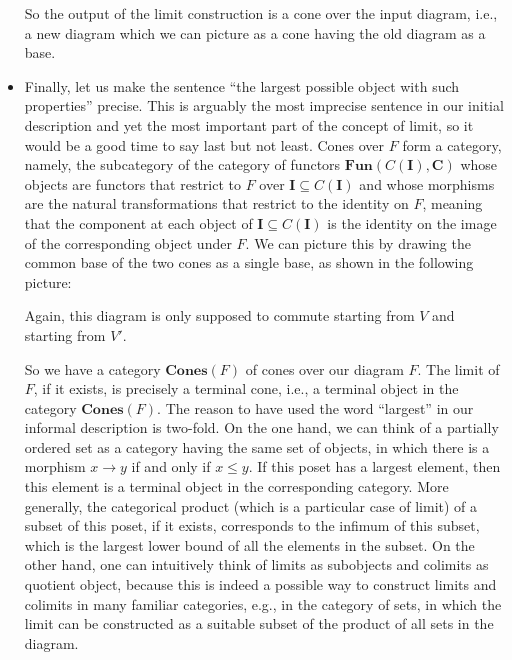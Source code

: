 \documentclass[12pt,a4paper]{amsart}
\theoremstyle{plain}
\theoremstyle{definition}
\theoremstyle{remark}
\begin{document}
\begin{itemize}
    So the output of the limit construction is a cone over the input diagram, i.e., a new diagram which we can picture as a cone having the old diagram as a base.
  \item Finally, let us make the sentence ``the largest possible object with such properties'' precise.
    This is arguably the most imprecise sentence in our initial description and yet the most important part of the concept of limit, so it would be a good time to say last but not least.
    Cones over $F$ form a category, namely, the subcategory of the category of functors $\mathbf{Fun}(C(\mathbf{I}),\mathbf{C})$ whose objects are functors that restrict to $F$ over $\mathbf{I} \subseteq C(\mathbf{I})$ and whose morphisms are the natural transformations that restrict to the identity on $F$, meaning that the component at each object of $\mathbf{I} \subseteq C(\mathbf{I})$ is the identity on the image of the corresponding object under $F$.
    We can picture this by drawing the common base of the two cones as a single base, as shown in the following picture:
    \begin{center}
    \end{center}
    Again, this diagram is only supposed to commute starting from $V$ and starting from $V'$.
    
    So we have a category $\mathbf{Cones}(F)$ of cones over our diagram $F$.
    The limit of $F$, if it exists, is precisely a terminal cone, i.e., a terminal object in the category $\mathbf{Cones}(F)$.
    The reason to have used the word ``largest'' in our informal description is two-fold.
    On the one hand, we can think of a partially ordered set as a category having the same set of objects, in which there is a morphism $x \to y$ if and only if $x \leq y$.
    If this poset has a largest element, then this element is a terminal object in the corresponding category.
    More generally, the categorical product (which is a particular case of limit) of a subset of this poset, if it exists, corresponds to the infimum of this subset, which is the largest lower bound of all the elements in the subset.
    On the other hand, one can intuitively think of limits as subobjects and colimits as quotient object, because this is indeed a possible way to construct limits and colimits in many familiar categories, e.g., in the category of sets, in which the limit can be constructed as a suitable subset of the product of all sets in the diagram.
\end{itemize}
\end{document}
